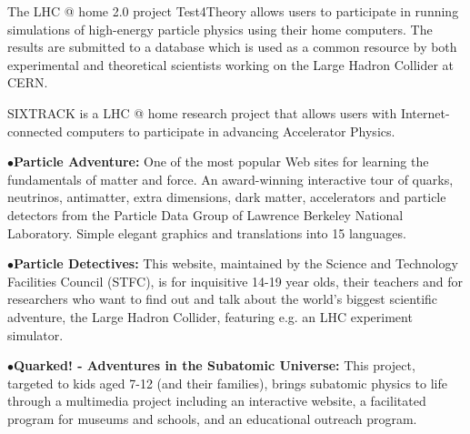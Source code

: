 \medskip

\item{}The LHC @ home 2.0 project Test4Theory allows users to participate in running simulations of high-energy particle physics using their home computers. The results are submitted to a database which is used as a common resource by both experimental and theoretical scientists working on the Large Hadron Collider at CERN.
	\item{}

\medskip

\item{}SIXTRACK is a LHC @ home research project that allows users with Internet-connected computers to participate in advancing Accelerator Physics.

	\item{}

\medskip

\item{$\bullet$}{\bf Particle Adventure:} 
One of the most popular Web sites for learning the fundamentals of matter and force. An award-winning interactive tour of quarks, neutrinos, antimatter, extra dimensions, dark matter, accelerators and particle detectors from the Particle Data Group of Lawrence Berkeley National Laboratory. Simple elegant graphics and translations into 15 languages.
	\item{}

\medskip

\item{$\bullet$}{\bf Particle Detectives:}
This website, maintained by the Science and Technology Facilities Council (STFC), is for inquisitive 14-19 year olds, their teachers and for researchers who want to find out and talk about the world's biggest scientific adventure, the Large Hadron Collider, featuring e.g. an LHC experiment simulator.
	\item{}

\medskip

\item{$\bullet$}{\bf Quarked! - Adventures in the Subatomic Universe:}
This project, targeted to kids aged 7-12 (and their families), brings subatomic physics to life through a multimedia project including an interactive website, a facilitated program for museums and schools, and an educational outreach program.
	\item{}

